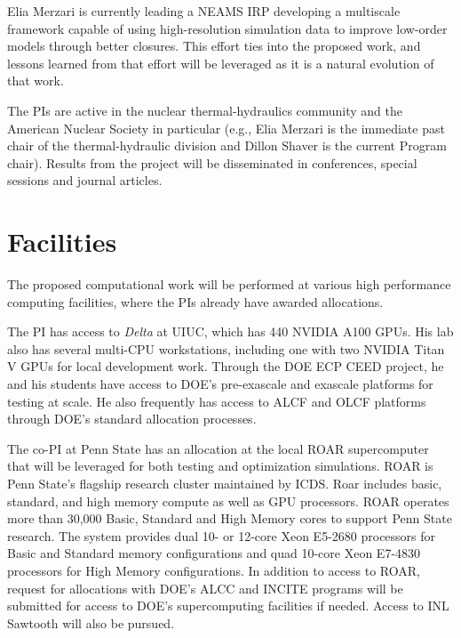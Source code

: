 Elia Merzari is currently leading a NEAMS IRP developing a multiscale framework
capable of using high-resolution simulation data to improve low-order models
through better closures. This effort ties into the proposed work, and lessons
learned from that effort will be leveraged as it is a natural evolution of that
work.

The PIs are active in the nuclear thermal-hydraulics community and the American
Nuclear Society in particular (e.g., Elia Merzari is the immediate past chair
of the thermal-hydraulic division and Dillon Shaver is the current Program
chair). Results from the project will be disseminated in conferences, special
sessions and journal articles.


\section{Facilities}
The proposed computational work will be performed at various high performance
computing facilities, where the PIs already have awarded allocations.

The PI has access to {\em Delta} at UIUC, which has 440 NVIDIA A100 GPUs.  His
lab also has several multi-CPU workstations, including one with two NVIDIA
Titan V GPUs for local development work.  Through the DOE ECP CEED project, he
and his students have access to DOE's pre-exascale and exascale platforms for
testing at scale.  He also frequently has access to ALCF and OLCF platforms
through DOE's standard allocation processes.


The co-PI at Penn State has an allocation at the local ROAR supercomputer that
will be leveraged for both testing and optimization simulations. ROAR is Penn
State’s flagship research cluster maintained by ICDS. Roar includes basic,
standard, and high memory compute as well as GPU processors. ROAR operates more
than 30,000 Basic, Standard and High Memory cores to support Penn State
research. The system provides dual 10- or 12-core Xeon E5-2680 processors for
Basic and Standard memory configurations and quad 10-core Xeon E7-4830
processors for High Memory configurations. In addition to access to ROAR,
request for allocations with DOE’s ALCC and INCITE programs will be submitted
for access to DOE’s supercomputing facilities if needed. Access to INL Sawtooth
will also be pursued.
%
%
%
%
%
%

